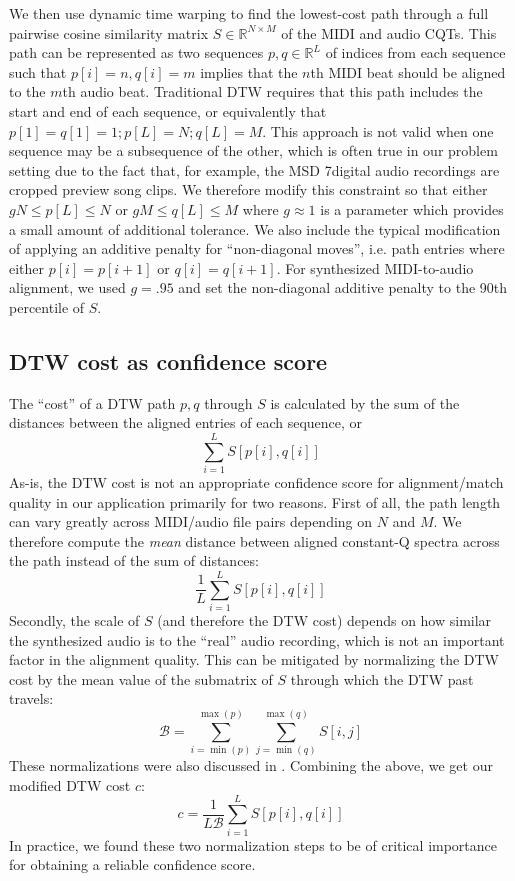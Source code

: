 \documentclass{article}
\begin{document}
We then use dynamic time warping to find the lowest-cost path through a full pairwise cosine similarity matrix $S \in \mathbb{R}^{N \times M}$ of the MIDI and audio CQTs.
This path can be represented as two sequences $p, q \in \mathbb{R}^L$ of indices from each sequence such that $p[i] = n, q[i] = m$ implies that the $n$th MIDI beat should be aligned to the $m$th audio beat.
Traditional DTW requires that this path includes the start and end of each sequence, or equivalently that $p[1] = q[1] = 1; p[L] = N; q[L] = M$.
This approach is not valid when one sequence may be a subsequence of the other, which is often true in our problem setting due to the fact that, for example, the MSD 7digital audio recordings are cropped preview song clips.
We therefore modify this constraint so that either $gN \le p[L] \le N$ or $gM \le q[L] \le M$ where $g \approx 1$ is a parameter which provides a small amount of additional tolerance.
We also include the typical modification of applying an additive penalty for ``non-diagonal moves'', i.e. path entries where either $p[i] = p[i + 1]$ or $q[i] = q[i + 1]$.
For synthesized MIDI-to-audio alignment, we used $g = .95$ and set the non-diagonal additive penalty to the 90th percentile of $S$.

\subsection{DTW cost as confidence score}

The ``cost'' of a DTW path $p, q$ through $S$ is calculated by the sum of the distances between the aligned entries of each sequence, or
$$
\sum_{i = 1}^L S[p[i], q[i]]
$$
As-is, the DTW cost is not an appropriate confidence score for alignment/match quality in our application primarily for two reasons.
First of all, the path length can vary greatly across MIDI/audio file pairs depending on $N$ and $M$.
We therefore compute the \textit{mean} distance between aligned constant-Q spectra across the path instead of the sum of distances:
$$
\frac{1}{L}\sum_{i = 1}^L S[p[i], q[i]]
$$
Secondly, the scale of $S$ (and therefore the DTW cost) depends on how similar the synthesized audio is to the ``real'' audio recording, which is not an important factor in the alignment quality.
This can be mitigated by normalizing the DTW cost by the mean value of the submatrix of $S$ through which the DTW past travels:
$$
\mathcal{B} = \sum_{i = \min(p)}^{\max(p)} \sum_{j = \min(q)}^{\max(q)} S[i, j] 
$$
These normalizations were also discussed in \cite{hu2003polyphonic}.
Combining the above, we get our modified DTW cost $c$:
$$
c = \frac{1}{L \mathcal{B}} \sum_{i = 1}^L S[p[i], q[i]]
$$
In practice, we found these two normalization steps to be of critical importance for obtaining a reliable confidence score.
\end{document}
